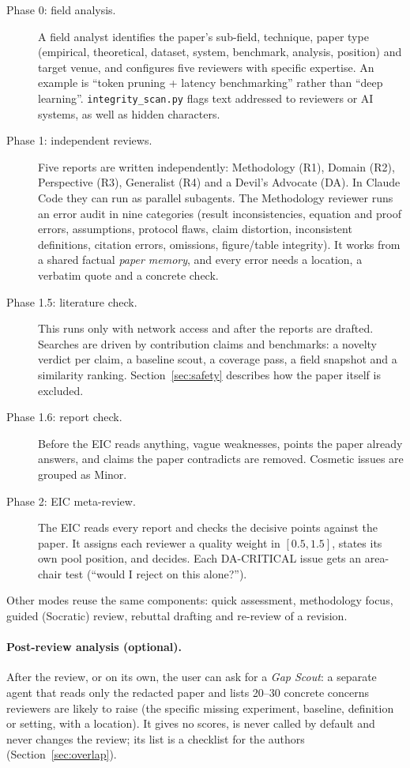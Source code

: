 \documentclass[11pt,a4paper]{article}
\newcommand{\code}[1]{\texttt{#1}}
\begin{document}
\begin{description}
\item[Phase 0: field analysis.] A field analyst identifies the paper's sub-field, technique, paper
type (empirical, theoretical, dataset, system, benchmark, analysis, position) and target venue,
and configures five reviewers with specific expertise. An example is ``token pruning + latency
benchmarking'' rather than ``deep learning''. \code{integrity\_scan.py} flags text addressed to
reviewers or AI systems, as well as hidden characters.
\item[Phase 1: independent reviews.] Five reports are written independently: Methodology (R1),
Domain (R2), Perspective (R3), Generalist (R4) and a Devil's Advocate (DA). In Claude Code they can
run as parallel subagents. The Methodology reviewer runs an error audit in nine categories (result
inconsistencies, equation and proof errors, assumptions, protocol flaws, claim distortion,
inconsistent definitions, citation errors, omissions, figure/table integrity). It works from a
shared factual \emph{paper memory}, and every error needs a location, a verbatim quote and a
concrete check.
\item[Phase 1.5: literature check.] This runs only with network access and after the reports are
drafted. Searches are driven by contribution claims and benchmarks: a novelty verdict per claim, a
baseline scout, a coverage pass, a field snapshot and a similarity ranking. Section~\ref{sec:safety}
describes how the paper itself is excluded.
\item[Phase 1.6: report check.] Before the EIC reads anything, vague weaknesses, points the paper
already answers, and claims the paper contradicts are removed. Cosmetic issues are grouped as Minor.
\item[Phase 2: EIC meta-review.] The EIC reads every report and checks the decisive points against
the paper. It assigns each reviewer a quality weight in $[0.5, 1.5]$, states its own pool position,
and decides. Each DA-CRITICAL issue gets an area-chair test (``would I reject on this alone?'').
\end{description}
Other modes reuse the same components: quick assessment, methodology focus, guided (Socratic)
review, rebuttal drafting and re-review of a revision.

\paragraph{Post-review analysis (optional).} After the review, or on its own, the user can ask
for a \emph{Gap Scout}: a separate agent that reads only the redacted paper and lists 20--30
concrete concerns reviewers are likely to raise (the specific missing experiment, baseline,
definition or setting, with a location). It gives no scores, is never called by default and never
changes the review; its list is a checklist for the authors (Section~\ref{sec:overlap}).
\end{document}

